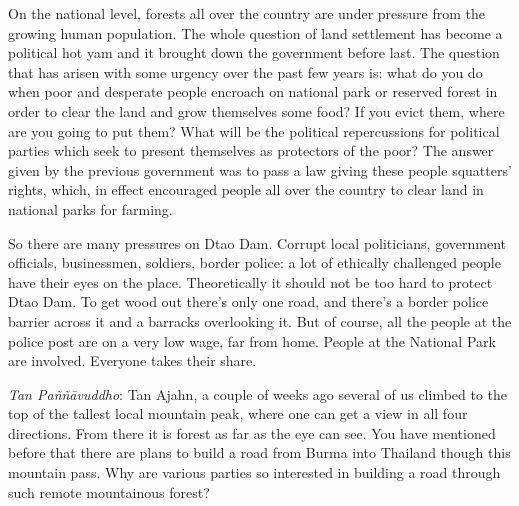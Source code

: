 On the national level, forests all over the country are under pressure
from the growing human population. The whole question of land settlement
has become a political hot yam and it brought down the government before
last. The question that has arisen with some urgency over the past few
years is: what do you do when poor and desperate people encroach on
national park or reserved forest in order to clear the land and grow
themselves some food? If you evict them, where are you going to put
them? What will be the political repercussions for political parties
which seek to present themselves as protectors of the poor? The answer
given by the previous government was to pass a law giving these people
squatters' rights, which, in effect encouraged people all over the
country to clear land in national parks for farming.

So there are many pressures on Dtao Dam. Corrupt local politicians,
government officials, businessmen, soldiers, border police: a lot of
ethically challenged people have their eyes on the place. Theoretically
it should not be too hard to protect Dtao Dam. To get wood out there's
only one road, and there's a border police barrier across it and a
barracks overlooking it. But of course, all the people at the police
post are on a very low wage, far from home. People at the National Park
are involved. Everyone takes their share.

\emph{Tan Paññāvuddho}‎: Tan Ajahn, a couple of weeks ago several of us
climbed to the top of the tallest local mountain peak, where one can get
a view in all four directions. From there it is forest as far as the eye
can see. You have mentioned before that there are plans to build a road
from Burma into Thailand though this mountain pass. Why are various
parties so interested in building a road through such remote mountainous
forest?

